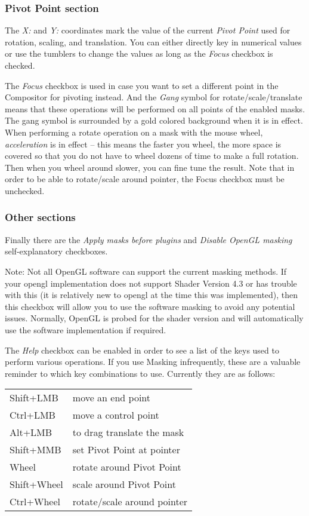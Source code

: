 \subsubsection*{Pivot Point section}%
\label{ssub:pivot_point_section}

The \textit{X:} and \textit{Y:} coordinates mark the value of the current \textit{Pivot Point} used for rotation, scaling, and translation.  You can either directly key in numerical values or use the tumblers to change the values as long as the \textit{Focus} checkbox is checked.

The \textit{Focus} checkbox is used in case you want to set a different point in the Compositor for pivoting instead.  And the \textit{Gang} symbol for rotate/scale/translate means that these operations will be performed on all points of the enabled masks.  The gang symbol is surrounded by a gold colored background when it is in effect.  When performing a rotate operation on a mask with the mouse wheel, \textit{acceleration} is in effect -- this means the faster you wheel, the more space is covered so that you do not have to wheel dozens of time to make a full rotation.  Then when you wheel around slower, you can fine tune the result.
Note that in order to be able to rotate/scale around pointer, the Focus checkbox must be unchecked.

\subsubsection*{Other sections}%
\label{ssub:other_sections}

Finally there are the \textit{Apply masks before plugins} and \textit{Disable OpenGL masking} self-explanatory checkboxes.

Note: Not all OpenGL software can support the current masking methods.  If your opengl implementation does not support Shader Version 4.3 or has trouble with this (it is relatively new to opengl at the time this was implemented), then this checkbox will allow you to use the software masking to avoid any potential issues.  Normally, OpenGL is probed for the shader version and will automatically use the software implementation if required.

The \textit{Help} checkbox can be enabled in order to see a list of the keys used to perform various operations.  If you use Masking infrequently, these are a valuable reminder to which key combinations to use.  Currently they are as follows:

\vspace{2ex}
\begin{tabular}{ll}
    \hline			
    Shift+LMB & move an end point \\
    Ctrl+LMB & move a control point \\
    Alt+LMB & to drag translate the mask \\
    Shift+MMB & set Pivot Point at pointer \\
    Wheel & rotate around Pivot Point \\
    Shift+Wheel & scale around Pivot Point \\
    Ctrl+Wheel & rotate/scale around pointer \\
    \hline  
\end{tabular}

